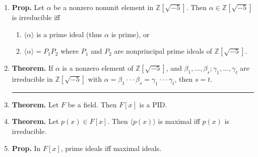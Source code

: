 \begin{enumerate}
	\item \textbf{Prop. } Let $\alpha$ be a nonzero nonunit element in $\mathbb{Z}[\sqrt{-5}]$. Then $\alpha \in \mathbb{Z}[\sqrt{-5}]$ is irreducible iff 
	\begin{enumerate}
		\item $\langle \alpha \rangle$ is a prime ideal (thus $\alpha$ is prime), or
		\item $\langle \alpha \rangle = P_1P_2$ where $P_1$ and $P_2$ are nonprincipal prime ideals of $\mathbb{Z}[\sqrt{-5}]$. 
	\end{enumerate}
	\item \textbf{Theorem. } If $\alpha$ is a nonzero element of $\mathbb{Z}[\sqrt{-5}]$, and $\beta_1,\dots,\beta_s; \gamma_1,\dots,\gamma_t$ are irreducible in $\mathbb{Z}[\sqrt{-5}]$ with $\alpha = \beta_1 \cdot \cdot \cdot \beta_s = \gamma_1 \cdot \cdot \cdot \gamma_t$, then $s=t$. 
	\begin{center}
		\hrule
	\end{center}
	\item \textbf{Theorem. } Let $F$ be a field. Then $F[x]$ is a PID. 
	\item \textbf{Theorem. } Let $p(x) \in F[x]$. Then $\langle p(x) \rangle$ is maximal iff $p(x)$ is irreducible. 
	\item \textbf{Prop. } In $F[x]$, prime ideals iff maximal ideals. 
\end{enumerate}



